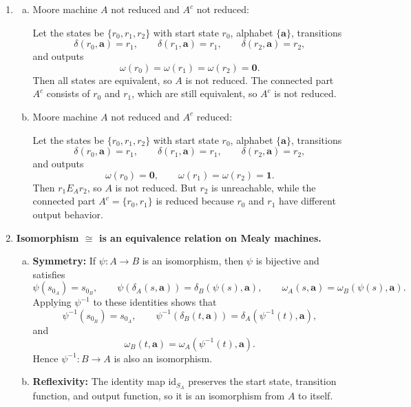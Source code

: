 \begin{enumerate}[{7.}1.]
\item \begin{enumerate}[(a)]
  \item Moore machine $A$ not reduced and $A^c$ not reduced:

  Let the states be $\{r_0,r_1,r_2\}$ with start state $r_0$, alphabet
  $\{\pmb{a}\}$, transitions
  \[
    \delta(r_0,\pmb{a})=r_1,\qquad
    \delta(r_1,\pmb{a})=r_1,\qquad
    \delta(r_2,\pmb{a})=r_2,
  \]
  and outputs
  \[
    \omega(r_0)=\omega(r_1)=\omega(r_2)=\pmb{0}.
  \]
  Then all states are equivalent, so $A$ is not reduced.  The connected part
  $A^c$ consists of $r_0$ and $r_1$, which are still equivalent, so $A^c$ is
  not reduced.

  \item Moore machine $A$ not reduced and $A^c$ reduced:

  Let the states be $\{r_0,r_1,r_2\}$ with start state $r_0$, alphabet
  $\{\pmb{a}\}$, transitions
  \[
    \delta(r_0,\pmb{a})=r_1,\qquad
    \delta(r_1,\pmb{a})=r_1,\qquad
    \delta(r_2,\pmb{a})=r_2,
  \]
  and outputs
  \[
    \omega(r_0)=\pmb{0},\qquad \omega(r_1)=\omega(r_2)=\pmb{1}.
  \]
  Then $r_1 E_A r_2$, so $A$ is not reduced.  But $r_2$ is unreachable, while
  the connected part $A^c=\{r_0,r_1\}$ is reduced because $r_0$ and $r_1$ have
  different output behavior.
\end{enumerate}

\item \textbf{Isomorphism $\cong$ is an equivalence relation on Mealy machines.}

\begin{enumerate}[(a)]
  \item \textbf{Symmetry:} If $\psi:A\to B$ is an isomorphism, then $\psi$ is
  bijective and satisfies
  \[
    \psi(s_{0_A})=s_{0_B},\qquad
    \psi(\delta_A(s,\pmb{a}))=\delta_B(\psi(s),\pmb{a}),\qquad
    \omega_A(s,\pmb{a})=\omega_B(\psi(s),\pmb{a}).
  \]
  Applying $\psi^{-1}$ to these identities shows that
  \[
    \psi^{-1}(s_{0_B})=s_{0_A},\qquad
    \psi^{-1}(\delta_B(t,\pmb{a}))=\delta_A(\psi^{-1}(t),\pmb{a}),
  \]
  and
  \[
    \omega_B(t,\pmb{a})=\omega_A(\psi^{-1}(t),\pmb{a}).
  \]
  Hence $\psi^{-1}:B\to A$ is also an isomorphism.

  \item \textbf{Reflexivity:} The identity map $\mathrm{id}_{S_A}$ preserves the
  start state, transition function, and output function, so it is an
  isomorphism from $A$ to itself.


\end{enumerate}
\end{enumerate}
